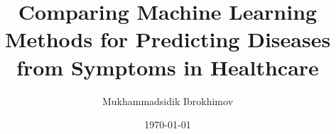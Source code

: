 \documentclass[12pt, a4paper, oneside]{report}
\title{Comparing Machine Learning Methods for Predicting Diseases from Symptoms in Healthcare}
\author{Mukhammadsidik Ibrokhimov}
\date{\today}
\begin{document}







\tableofcontents
\listoffigures
\listoftables





\clearpage
{}
\setcounter{page}{1}














\begin{appendices}

\end{appendices}
\end{document}
